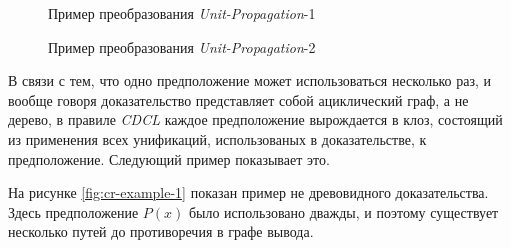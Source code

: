 \begin{figure}
  \begin{prooftree}
  \end{prooftree}
  \caption{Пример преобразования \emph{Unit-Propagation}-1}
  \label{fig:ecr-hard-example-1}
\end{figure}

\begin{figure}
  \begin{prooftree}
  \end{prooftree}
  \caption{Пример преобразования \emph{Unit-Propagation}-2}
  \label{fig:ecr-hard-example-2}
\end{figure}



В связи с тем, что одно предположение может использоваться несколько раз, и вообще говоря доказательство представляет собой ациклический граф, а не дерево, в правиле \emph{CDCL} каждое предположение вырождается в клоз, состоящий из применения всех унификаций, использованых в доказательстве, к предположение. Следующий пример показывает это.
\begin{example}
\label{exmpl:cr-nonEPR}
На рисунке \ref{fig:cr-example-1} показан пример не древовидного доказательства. Здесь предположение $P(x)$ было использовано дважды, и поэтому существует несколько путей до противоречия в графе вывода.
\end{example}

